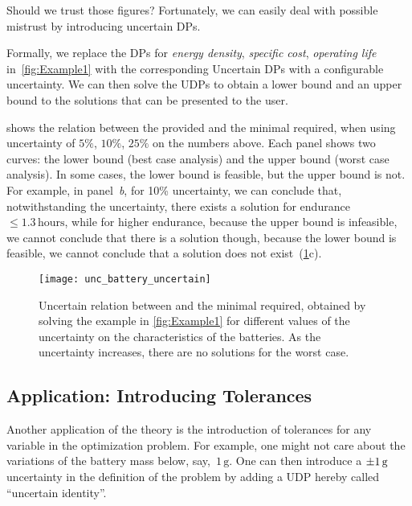 Should we trust those figures? Fortunately, we can easily deal with
possible mistrust by introducing uncertain DPs.

Formally, we replace the DPs for\emph{ energy density}, \emph{specific
cost}, \emph{operating life} in~\cref{fig:Example1} with the
corresponding Uncertain DPs with a configurable uncertainty.
We can
then solve the UDPs to obtain a lower bound and an upper bound to
the solutions that can be presented to the user.

 shows the relation between
the provided  and the minimal  required,
when using uncertainty of $5\%$, $10\%$, $25\%$ on the numbers
above.
Each panel shows two curves: the lower bound (best case analysis)
and the upper bound (worst case analysis).
In some cases, the lower
bound is feasible, but the upper bound is not.
For example, in panel~\emph{b},
for 10\% uncertainty, we can conclude that, notwithstanding the uncertainty,
there exists a solution for endurance~$\leq1.3\,\text{hours}$, while
for higher endurance, because the upper bound is infeasible, we cannot
conclude that there is a solution \textemdash{} though, because the
lower bound is feasible, we cannot conclude that a solution does not
exist~(\cref{fig:unc_battery_uncertain}c).

\begin{figure}[h]
    \begin{centering}
        \texttt{[image: unc\_battery\_uncertain]}
    \end{centering}
    \caption{Uncertain relation between 
    and the minimal  required, obtained by solving the
    example in \cref{fig:Example1} for different values of the uncertainty
    on the characteristics of the batteries.
    As the uncertainty increases,
        there are no solutions for the worst case.}
    \label{fig:unc_battery_uncertain}
\end{figure}

\subsection{Application: Introducing Tolerances\label{sec:Application-tolerance}}

Another application of the theory is the introduction of tolerances
for any variable in the optimization problem.
For example, one might
not care about the variations of the battery mass below, say,~$1\,\text{g}$.
One can then introduce a $\pm1\,\text{\ensuremath{\text{g}} }$ uncertainty
in the definition of the problem by adding a UDP hereby called ``uncertain
identity''.


